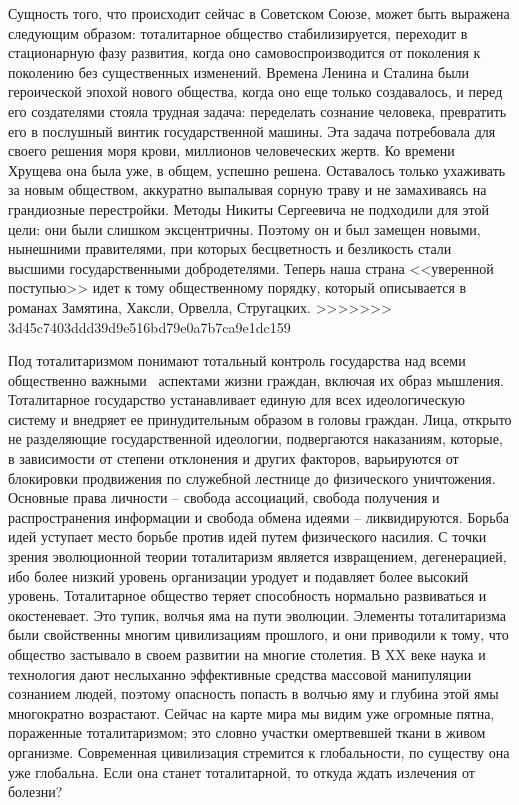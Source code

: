 \documentclass{book}
\begin{document}
Сущность того, что происходит сейчас в Советском Союзе, может быть выражена следующим образом: тоталитарное общество 
стабилизируется, переходит в стационарную фазу развития, когда оно самовоспроизводится от поколения к поколению без существенных 
изменений. Времена Ленина и Сталина были героической эпохой нового общества, когда оно еще только создавалось, и перед его 
создателями стояла трудная задача: переделать сознание человека, превратить его в послушный винтик государственной машины. Эта 
задача потребовала для своего решения моря крови, миллионов человеческих жертв. Ко времени Хрущева она была уже, в общем, 
успешно решена. Оставалось только ухаживать за новым обществом, аккуратно выпалывая сорную траву и не замахиваясь на гран­диозные 
перестройки. Методы Никиты Сергеевича не подхо­дили для этой цели: они были слишком эксцентричны. Поэтому он и был замещен 
новыми, нынешними правителями, при которых бесцветность и безликость стали высшими государственными добродетелями. Теперь наша 
страна <<уверенной поступью>> идет к тому общественному порядку, который описывается в романах Замятина, Хаксли, Орвелла, Стругацких.
>>>>>>> 3d45c7403ddd39d9e516bd79e0a7b7ca9e1dc159

Под тоталитаризмом понимают тотальный контроль государства над всеми общественно важными  аспектами жизни граждан, включая их образ мышления. Тоталитарное государ­ство устанавливает единую для всех идеологическую систему и внедряет ее принудительным образом в головы граждан. Лица, открыто не разделяющие государственной идеологии, подвергаются наказаниям, которые, в зависимости от степени отклонения и других факторов, варьируются от блокировки продвижения по служебной лестнице до физического уничтожения. Основные права личности -- свобода ассоциаций, свобода получения и распространения информации и свобода обмена идеями -- ликвидируются. Борьба идей уступает место борьбе против  идей путем физического насилия. С точки зрения эволюционной теории тоталитаризм является извращением, дегенерацией, ибо более низкий уровень организации уродует и подавляет более высокий уровень. Тоталитарное общество теряет способность нормально развиваться и око­стеневает. Это тупик, волчья яма на пути эволюции.
Элементы тоталитаризма были свойственны многим циви­лизациям прошлого, и они приводили к тому, что общество застывало в своем 
развитии на многие столетия. В XX веке наука и технология дают неслыханно эффективные средства массовой манипуляции сознанием 
людей, поэтому опасность попасть в волчью яму и глубина этой ямы многократно возрастают. Сейчас на карте мира мы видим уже 
огромные пятна, пораженные тоталитаризмом; это словно участки омертвевшей ткани в живом организме. Современная цивилизация 
стремится к глобальности, по существу она уже глобальна. Если она станет тоталитарной, то откуда ждать излечения от болезни?
\end{document}
